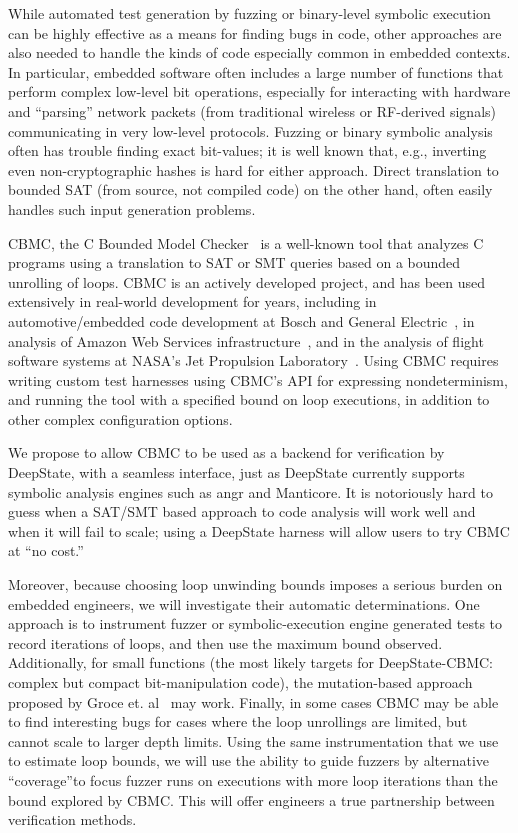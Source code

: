 While automated test generation by fuzzing or binary-level symbolic execution can be highly effective as a means for finding bugs in code, other approaches are also needed to handle the kinds of code especially common in embedded contexts.  In particular, embedded software often includes a large number of functions that perform complex low-level bit operations, especially for interacting with hardware and ``parsing'' network packets (from traditional wireless or RF-derived signals) communicating in very low-level protocols.  Fuzzing or binary symbolic analysis often has trouble  finding exact bit-values; it is well known that, e.g., inverting even non-cryptographic hashes is hard for either approach.  Direct translation to bounded SAT (from source, not compiled code) on the other hand, often easily handles such input generation problems.

CBMC, the C Bounded Model Checker~\cite{cbmcp} is a well-known tool that analyzes C programs using a translation to SAT or SMT queries based on a bounded unrolling of loops. CBMC is an actively developed project, and has been used extensively in real-world development for years, including in automotive/embedded code development at Bosch and General Electric~\cite{tiemeyer2019crest}, in analysis of Amazon Web Services infrastructure~\cite{awsmodel}, and in the analysis of flight software systems at NASA's Jet Propulsion Laboratory~\cite{AMAI}.  Using CBMC requires writing custom test harnesses using CBMC's API for expressing nondeterminism, and running the tool with a specified bound on loop executions, in addition to other complex configuration options.

We propose to allow CBMC to be used as a backend for verification by DeepState, with a seamless interface, just as DeepState currently supports symbolic analysis engines such as angr and Manticore.  It is notoriously hard to guess when a SAT/SMT based approach to code analysis will work well and when it will fail to scale; using a DeepState harness will allow users to try CBMC at ``no cost.''

Moreover, because choosing loop unwinding bounds imposes a serious burden on embedded engineers, we will investigate their automatic determinations.  One approach is to instrument fuzzer or symbolic-execution engine generated tests to record iterations of loops, and then use the maximum bound observed.  Additionally, for small functions (the most likely targets for DeepState-CBMC: complex but compact bit-manipulation code), the mutation-based approach proposed by Groce et. al~\cite{groce2018verified} may work.  Finally, in some cases CBMC may be able to find interesting bugs for cases where the loop unrollings are limited, but cannot scale to larger depth limits.  Using the same instrumentation that we use to estimate loop bounds, we will use the ability to guide fuzzers by alternative ``coverage''to focus fuzzer runs on executions with more loop iterations than the bound explored by CBMC.  This will offer engineers a true partnership between verification methods. 
